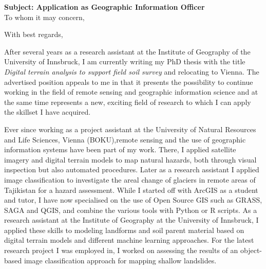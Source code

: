 \documentclass[11pt,a4paper,sans]{moderncv}        %
\begin{document}
\renewcommand*{\bibliographyhead}[1]{}

\date{March 13, 2018}
\opening{\textbf{Subject: Application as Geographic Information Officer} \\[0.5cm]     To whom it may concern,}
\closing{With best regards,}

\makelettertitle
\justify
\vspace{-0.5cm} %
After several years as a research assistant at the Institute of Geography of the University of Innsbruck, I am currently writing my PhD thesis  with the title \emph{Digital terrain analysis to support field soil survey} and relocating to Vienna. The advertised position  appeals to me in that it presents the possibility to continue working in the field of remote sensing and geographic information science and at the same time represents a new, exciting field of research to which I can apply the skillset I have acquired.

Ever since working as a project assistant at the University of Natural Resources and Life Sciences, Vienna (BOKU),remote sensing and the use of geographic information systems have been part of my work. There, I applied satellite imagery and digital terrain models to map natural hazards, both through visual inspection but also automated procedures. Later as a research assistant I  applied image classification to investigate the areal change of glaciers in remote areas of Tajikistan for a hazard assessment. While I started off with ArcGIS as a student and tutor, I have now specialised on the use of Open Source GIS such as GRASS, SAGA and QGIS, and combine the various tools with Python or R scripts. As a research assistant at the Institute of Geography at the University of Innsbruck, I applied these skills to modeling landforms and soil parent material based on digital terrain models and different machine learning approaches. For the latest research project I was employed in, I worked on assessing the results of an object-based image classification approach for mapping shallow landslides.
\end{document}

